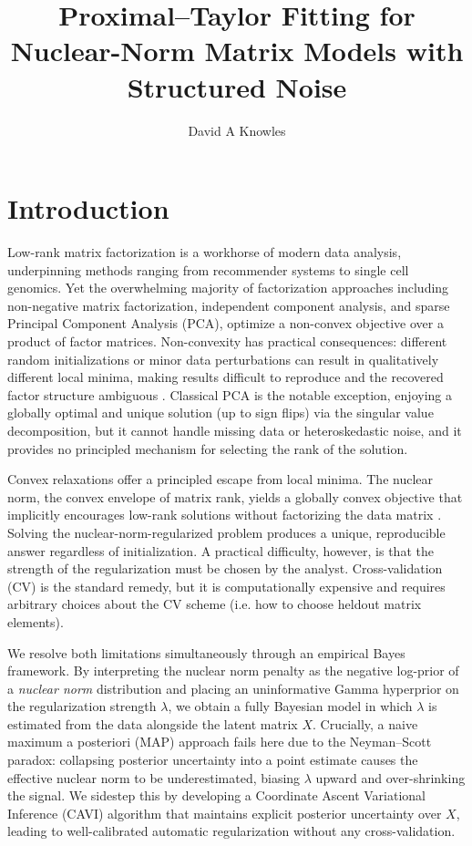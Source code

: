 \documentclass[11pt]{article}
\title{Proximal--Taylor Fitting for Nuclear-Norm Matrix Models with Structured Noise}
\author{David A Knowles}
\date{}
\begin{document}
\maketitle

\section{Introduction}

Low-rank matrix factorization is a workhorse of modern data analysis, underpinning methods ranging from recommender systems to single cell genomics. Yet the overwhelming majority of factorization approaches including non-negative matrix factorization, independent component analysis, and sparse Principal Component Analysis (PCA), optimize a non-convex objective over a product of factor matrices. Non-convexity has practical consequences: different random initializations or minor data perturbations can result in qualitatively different local minima, making results difficult to reproduce and the recovered factor structure ambiguous \citep{lee1999learning, cai2021}. Classical PCA is the notable exception, enjoying a globally optimal and unique solution (up to sign flips) via the singular value decomposition, but it cannot handle missing data or heteroskedastic noise, and it provides no principled mechanism for selecting the rank of the solution.

Convex relaxations offer a principled escape from local minima. The nuclear norm, the convex envelope of matrix rank, yields a globally convex objective that implicitly encourages low-rank solutions without factorizing the data matrix \citep{recht2010guaranteed, candes2010power}. Solving the nuclear-norm-regularized problem produces a unique, reproducible answer regardless of initialization. A practical difficulty, however, is that the strength of the regularization must be chosen by the analyst. Cross-validation (CV) is the standard remedy, but it is computationally expensive and requires arbitrary choices about the CV scheme (i.e. how to choose heldout matrix elements).

We resolve both limitations simultaneously through an empirical Bayes framework. By interpreting the nuclear norm penalty as the negative log-prior of a \emph{nuclear norm} distribution and placing an uninformative Gamma hyperprior on the regularization strength $\lambda$, we obtain a fully Bayesian model in which $\lambda$ is estimated from the data alongside the latent matrix $X$. Crucially, a naive maximum a posteriori (MAP) approach fails here due to the Neyman--Scott paradox: collapsing posterior uncertainty into a point estimate causes the effective nuclear norm to be underestimated, biasing $\lambda$ upward and over-shrinking the signal. We sidestep this by developing a Coordinate Ascent Variational Inference (CAVI) algorithm that maintains explicit posterior uncertainty over $X$, leading to well-calibrated automatic regularization without any cross-validation.
\end{document}

